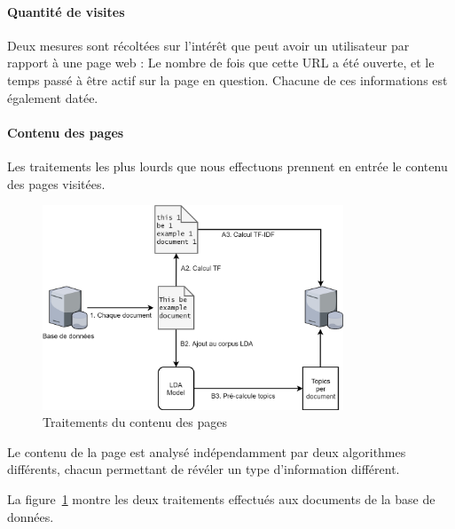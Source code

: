 			\paragraph{Quantité de visites}

				Deux mesures sont récoltées sur l'intérêt que peut avoir un utilisateur par rapport à une page web : Le nombre de fois que cette URL a été ouverte, et le temps passé à être actif sur la page en question. Chacune de ces informations est également datée.

			\paragraph{Contenu des pages}

				Les traitements les plus lourds que nous effectuons prennent en entrée le contenu des pages visitées.

				\begin{figure}[!h]
					\centering
					\includegraphics[width=0.8\textwidth]{images/design/traitement_offline}
					\caption{Traitements du contenu des pages}
					\label{d-traitements}
				\end{figure}

				Le contenu de la page est analysé indépendamment par deux algorithmes différents, chacun permettant de révéler un type d'information différent.

				La figure~\ref{d-traitements} montre les deux traitements effectués aux documents de la base de données.

